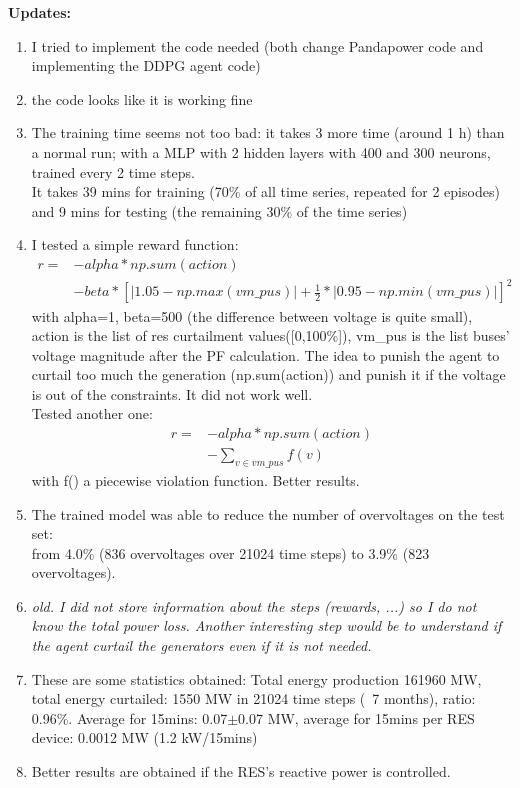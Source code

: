 \noindent \textbf{Updates:}
\begin{enumerate}
    \item I tried to implement the code needed (both change Pandapower code and implementing the DDPG agent code)
    \item the code looks like it is working fine
    \item The training time seems not too bad: it takes 3 more time (around 1 h) than a normal run; with a MLP with 2 hidden layers with 400 and 300 neurons, trained every 2 time steps.\\
    It takes 39 mins for training (70\% of all time series, repeated for 2 episodes) and 9 mins for testing (the remaining 30\% of the time series)
    \item I tested a simple reward function:
    \begin{align*}
        r = &- alpha * np.sum(action) \\
            &- beta*[|1.05-np.max(vm\_pus)|+\frac{1}{2}*|0.95-np.min(vm\_pus)|]^2
    \end{align*}
    with alpha=1, beta=500 (the difference between voltage is quite small), action is the list of res curtailment values([0,100\%]), vm\_pus is the list buses' voltage magnitude after the PF calculation. The idea to punish the agent to curtail too much the generation (np.sum(action)) and punish it if the voltage is out of the constraints. It did not work well. \\
    
    Tested another one:
    \begin{align*}
        r = &- alpha * np.sum(action) \\
            &- \sum_{v \in vm\_pus} f(v)
    \end{align*}
    with f() a piecewise violation function. Better results.
    \item The trained model was able to reduce the number of overvoltages on the test set:\\
    from 4.0\% (836 overvoltages over 21024 time steps) to 3.9\% (823 overvoltages). 
    \item \emph{old. I did not store information about the steps (rewards, ...) so I do not know the total power loss. Another interesting step would be to understand if the agent curtail the generators even if it is not needed.}
    \item These are some statistics obtained:
    Total energy production 161960 MW, total energy curtailed: 1550 MW in 21024 time steps (~7 months), ratio: 0.96\%. Average for 15mins: 0.07$\pm$0.07 MW, average for 15mins per RES device: 0.0012 MW (1.2 kW/15mins)
    \item Better results are obtained if the RES's reactive power is controlled.
\end{enumerate}



